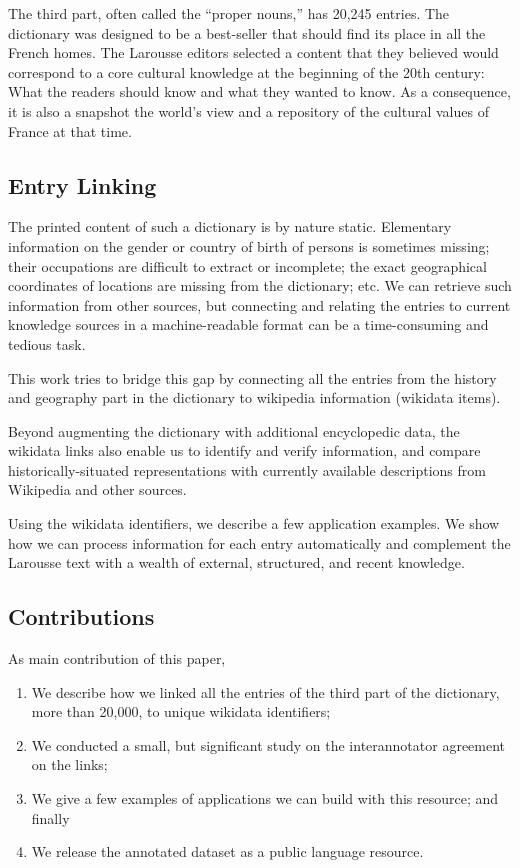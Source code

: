 \documentclass[10pt, a4paper]{article}
\begin{document}
The third part, often called the ``proper nouns,'' has 20,245 entries. The dictionary was designed to be a best-seller that should find its place in all the French homes. The Larousse editors selected a content that they believed would correspond to a core cultural knowledge at the beginning of the 20th century: What the readers should know and what they wanted to know. As a consequence, it is also a snapshot the world's view and a repository of the cultural values of France at that time. 

\subsection{Entry Linking}
The printed content of such a dictionary is by nature static. Elementary information on the gender or country of birth of persons is sometimes missing; their occupations are difficult to extract or incomplete; the exact geographical coordinates of locations are missing from the dictionary; etc. We can retrieve such information from other sources, but connecting and relating the entries to current knowledge sources in a machine-readable format can be a time-consuming and tedious task. 

This work tries to bridge this gap by connecting all the entries from the history and geography part in the dictionary to wikipedia information (wikidata items). 

Beyond augmenting the dictionary with additional encyclopedic data, the wikidata links also enable us to identify and verify information, and compare historically-situated representations with currently available descriptions from Wikipedia and other sources.


Using the wikidata identifiers, we describe a few application examples. We show how we can process information for each entry automatically and complement the Larousse text with a wealth of external, structured, and recent knowledge. 

\subsection{Contributions}
As main contribution of this paper, 
\begin{enumerate}
    \item We describe how we linked all the entries of the third part of the dictionary, more than 20,000, to unique wikidata identifiers;
    \item We conducted a small, but significant study on the interannotator agreement on the links;
    \item We give a few examples of applications we can build with this resource; and finally
    \item We release the annotated dataset as a public language resource.
\end{enumerate}
 
\end{document}
